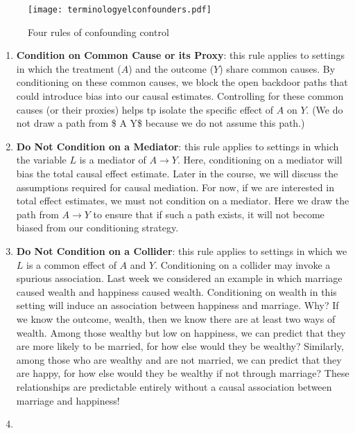 \documentclass[
  singlecolumn]{article}
\begin{document}
\begin{figure}

\texttt{[image: terminologyelconfounders.pdf]}

\caption{\label{fig-terminologyconfounders}Four rules of confounding
control}

\end{figure}%

\begin{enumerate}
\def\labelenumi{\arabic{enumi}.}
\item
  \textbf{Condition on Common Cause or its Proxy}: this rule applies to
  settings in which the treatment (\(A\)) and the outcome (\(Y\)) share
  common causes. By conditioning on these common causes, we block the
  open backdoor paths that could introduce bias into our causal
  estimates. Controlling for these common causes (or their proxies)
  helps tp isolate the specific effect of \(A\) on \(Y\). (We do not
  draw a path from \$ A \to Y\$ because we do not assume this path.)
\item
  \textbf{Do Not Condition on a Mediator}: this rule applies to settings
  in which the variable \(L\) is a mediator of \(A \to Y\). Here,
  conditioning on a mediator will bias the total causal effect estimate.
  Later in the course, we will discuss the assumptions required for
  causal mediation. For now, if we are interested in total effect
  estimates, we must not condition on a mediator. Here we draw the path
  from \(A \to Y\) to ensure that if such a path exists, it will not
  become biased from our conditioning strategy.
\item
  \textbf{Do Not Condition on a Collider}: this rule applies to settings
  in which we \(L\) is a common effect of \(A\) and \(Y\). Conditioning
  on a collider may invoke a spurious association. Last week we
  considered an example in which marriage caused wealth and happiness
  caused wealth. Conditioning on wealth in this setting will induce an
  association between happiness and marriage. Why? If we know the
  outcome, wealth, then we know there are at least two ways of wealth.
  Among those wealthy but low on happiness, we can predict that they are
  more likely to be married, for how else would they be wealthy?
  Similarly, among those who are wealthy and are not married, we can
  predict that they are happy, for how else would they be wealthy if not
  through marriage? These relationships are predictable entirely without
  a causal association between marriage and happiness!
\item

\end{enumerate}
\end{document}
